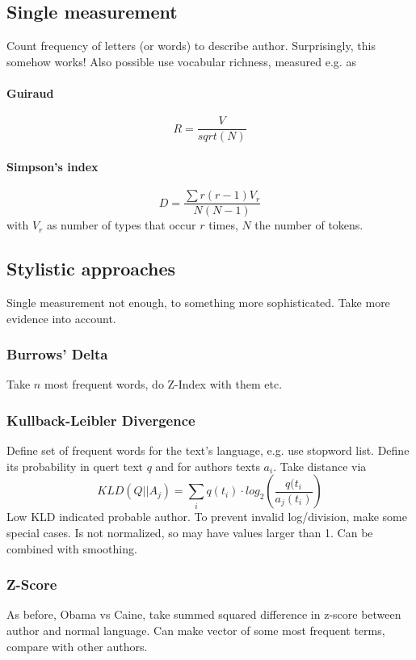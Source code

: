 \documentclass[11pt]{article}
\begin{document}
\subsection{Single measurement}
Count frequency of letters (or words) to describe author. Surprisingly, this somehow works!
Also possible use vocabular richness, measured e.g. as 
\paragraph{Guiraud}
\begin{equation}
	R = \frac{V}{sqrt(N)}
\end{equation}
\paragraph{Simpson's index}
\begin{equation}
	D = \frac{\sum r(r-1) V_r}{N(N-1)}
\end{equation}
with $V_r$ as number of types that occur $r$ times, $N$ the number of tokens.
\subsection{Stylistic approaches}
Single measurement not enough, to something more sophisticated. Take more evidence into
account. 
\subsubsection{Burrows' Delta}
Take $n$ most frequent words, do Z-Index with them etc.
\subsubsection{Kullback-Leibler Divergence}
Define set of frequent words for the text's language, e.g. use stopword list. 
Define its probability in quert text
 $q$ and for authors texts $a_i$. Take distance via
\begin{equation}
	KLD(Q|| A_j) = \sum_i q(t_i) \cdot log_2 \left( \frac{q(t_i}{a_j(t_i)} \right)
\end{equation}
Low KLD indicated probable author. To prevent invalid log/division, make some special cases.
Is not normalized, so may have values larger than 1. Can be combined with smoothing.
\subsubsection{Z-Score}
As before, Obama vs Caine, take summed squared difference in z-score between author and 
normal language. Can make vector of some most frequent terms, compare with other authors.
\end{document}
